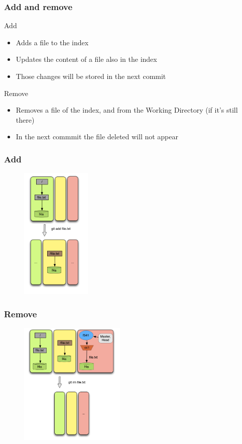 \documentclass{beamer}
\begin{document}
\begin{frame}
	\frametitle{Add and remove}

	\begin{block}{Add}
	\begin{itemize}
		\item Adds a file to the index
		\item Updates the content of a file
		also in the index
		\item Those changes will be stored in the next commit
	\end{itemize}
	\end{block}

	\begin{block}{Remove}
	\begin{itemize}
		\item Removes a file of the index, and from the
		Working Directory (if it's still there)
		\item In the next commmit the file deleted will not appear
	\end{itemize}
	\end{block}

\end{frame}

\begin{frame}[fragile]
   \frametitle{Add}
   \begin{figure}
      \centering
      \includegraphics[width=0.3\textwidth]{images/add1.png}
   \end{figure}
\end{frame}

\begin{frame}[fragile]
   \frametitle{Remove}
   \begin{figure}
      \centering
      \includegraphics[width=0.45\textwidth]{images/remove1.png}
   \end{figure}
\end{frame}
\end{document}
